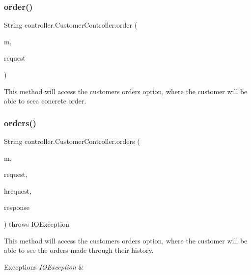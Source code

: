 \subsubsection{\texorpdfstring{order()}{order()}}
{\footnotesize\ttfamily String controller.\+Customer\+Controller.\+order (\begin{DoxyParamCaption}\item[{Model}]{m,  }\item[{Web\+Request}]{request }\end{DoxyParamCaption})\hspace{0.3cm}{\ttfamily [inline]}}

This method will access the customer\textquotesingle{}s \textquotesingle{}orders\textquotesingle{} option, where the customer will be able to seea concrete order. \mbox{\label{classcontroller_1_1_customer_controller_af47f965b533083f4415c63f1065cbd64}} 
\subsubsection{\texorpdfstring{orders()}{orders()}}
{\footnotesize\ttfamily String controller.\+Customer\+Controller.\+orders (\begin{DoxyParamCaption}\item[{Model}]{m,  }\item[{Web\+Request}]{request,  }\item[{Http\+Servlet\+Request}]{hrequest,  }\item[{Http\+Servlet\+Response}]{response }\end{DoxyParamCaption}) throws I\+O\+Exception\hspace{0.3cm}{\ttfamily [inline]}}

This method will access the customer\textquotesingle{}s \textquotesingle{}orders\textquotesingle{} option, where the customer will be able to see the orders made through their history. 
\begin{DoxyExceptions}{Exceptions}
{\em I\+O\+Exception} & \\
\hline
\end{DoxyExceptions}
\mbox{\label{classcontroller_1_1_customer_controller_a9c7aebe2a5ae4e7419fd10121a6a7189}} 
